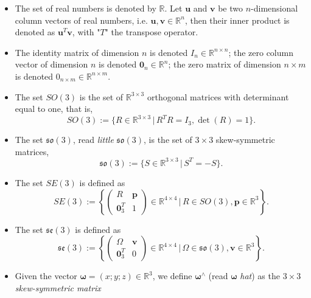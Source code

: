 \begin{itemize}
    \item The set of real numbers is denoted by $\mathbb{R}$. Let $ \mathbf{u}$ and $ \mathbf{v}$ be two $n$-dimensional column vectors of real numbers, i.e. $ \mathbf{u},  \mathbf{v} \in \mathbb{R}^n$, then their inner product is denoted as $ \mathbf{u}^T  \mathbf{v}$, with "$T$" the transpose operator.
    \item The identity matrix of dimension $n$ is denoted $ {I}_n \in \mathbb{R}^{n\times n}$; the zero column vector of dimension $n$ is denoted $ \mathbf{0}_n \in \mathbb{R}^n$; the zero matrix of dimension $n\times m$ is denoted $ {0}_{n\times m} \in \mathbb{R}^{n\times m}$.
    \item The set $SO(3)$ is the set of $\mathbb{R}^{3\times 3}$ orthogonal matrices with determinant equal to one, that is,
    \begin{equation}
    SO(3) := \{  {R} \in \mathbb{R}^{3\times 3} \,|\,  {R}^T  {R} =  {I}_3, \det( {R}) = 1 \}.
    \end{equation}
    \item The set $\mathfrak{so}(3)$, read \textit{little} $\mathfrak{so}(3)$, is the set of $3\times 3$ skew-symmetric matrices,
    \begin{equation}
    \mathfrak{so}(3) := \{  {S} \in \mathbb{R}^{3\times 3} \,|\,  {S}^T = - {S} \}.
    \end{equation}
    \item The set $SE(3)$ is defined as
    \begin{equation}
    SE(3) := \left\{ \begin{pmatrix}  {R} &  \mathbf{p} \\  \mathbf{0}_3^T & 1 \end{pmatrix} \in \mathbb{R}^{4\times 4} \,|\,  {R} \in SO(3),  \mathbf{p} \in \mathbb{R}^3 \right\}.
    \end{equation}
    \item The set $\mathfrak{se}(3)$ is defined as
    \begin{equation}
    \mathfrak{se}(3) := \left\{ \begin{pmatrix} \Omega & \mathbf{v} \\  \mathbf{0}_{3}^T & 0 \end{pmatrix} \in \mathbb{R}^{4\times 4} \,|\, \Omega \in \mathfrak{so}(3), \mathbf{v} \in \mathbb{R}^3 \right\}.
    \end{equation}
    \item Given the vector ${\bm{\omega}} = (x; y; z) \in \mathbb{R}^3$, we define $\bm{\omega}^\wedge$ (read $\bm{\omega}$ \textit{hat}) as the $3\times 3$ \textit{skew-symmetric matrix}

\end{itemize}
